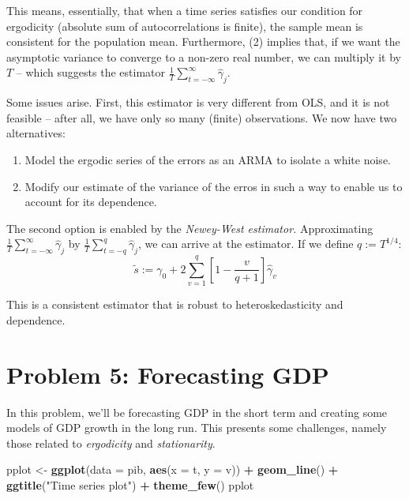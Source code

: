 \documentclass[11pt, a4paper]{report}
\newenvironment{Shaded}{\begin{snugshade}}{\end{snugshade}}
\newcommand{\DataTypeTok}[1]{\textcolor[rgb]{0.13,0.29,0.53}{#1}}
\newcommand{\KeywordTok}[1]{\textcolor[rgb]{0.13,0.29,0.53}{\textbf{#1}}}
\newcommand{\NormalTok}[1]{#1}
\newcommand{\OperatorTok}[1]{\textcolor[rgb]{0.81,0.36,0.00}{\textbf{#1}}}
\newcommand{\StringTok}[1]{\textcolor[rgb]{0.31,0.60,0.02}{#1}}
\theoremstyle{plain}
\theoremstyle{plain}
\theoremstyle{remark}
\begin{document}
This means, essentially, that when a time series satisfies our condition for ergodicity (absolute sum of autocorrelations is finite), the sample mean is consistent for the population mean. Furthermore, (2) implies that, if we want the asymptotic variance to converge to a non-zero real number, we can multiply it by $T$ -- which suggests the estimator $\frac{1}{T} \sum_{t = -\infty}^{\infty} \hat{\gamma}_j$.

Some issues arise. First, this estimator is very different from OLS, and it is not feasible -- after all, we have only so many (finite) observations. We now have two alternatives: \begin{enumerate}
\item Model the ergodic series of the errors as an ARMA to isolate a white noise.
\item Modify our estimate of the variance of the erros in such a way to enable us to account for its dependence. 
\end{enumerate}

The second option is enabled by the \textit{Newey-West estimator.} Approximating $\frac{1}{T} \sum_{t = -\infty}^{\infty} \hat{\gamma}_j$ by $\frac{1}{T} \sum_{t = -q}^{q} \hat{\gamma}_j$, we can arrive at the estimator. If we define $q := T^{1/4}$:
$$\tilde{s} := \gamma_0 + 2\sum_{v=1}^q \left[1 - \dfrac{v}{q+1}\right]\hat{\gamma}_v$$

This is a consistent estimator that is robust to heteroskedasticity and dependence.






\chapter{Problem 5: Forecasting GDP}

In this problem, we'll be forecasting GDP in the short term and creating
some models of GDP growth in the long run. This presents some
challenges, namely those related to \emph{ergodicity} and
\emph{stationarity}.

\begin{Shaded}
	\begin{Highlighting}[]
		\NormalTok{pplot <-}\StringTok{ }\KeywordTok{ggplot}\NormalTok{(}\DataTypeTok{data =}\NormalTok{ pib, }\KeywordTok{aes}\NormalTok{(}\DataTypeTok{x =}\NormalTok{ t, }\DataTypeTok{y =}\NormalTok{ v)) }\OperatorTok{+}\StringTok{ }\KeywordTok{geom_line}\NormalTok{() }\OperatorTok{+}\StringTok{ }
		\StringTok{    }\KeywordTok{ggtitle}\NormalTok{(}\StringTok{"Time series plot"}\NormalTok{) }\OperatorTok{+}\StringTok{ }\KeywordTok{theme_few}\NormalTok{()}
		\NormalTok{pplot}
	\end{Highlighting}
\end{Shaded}
\end{document}
